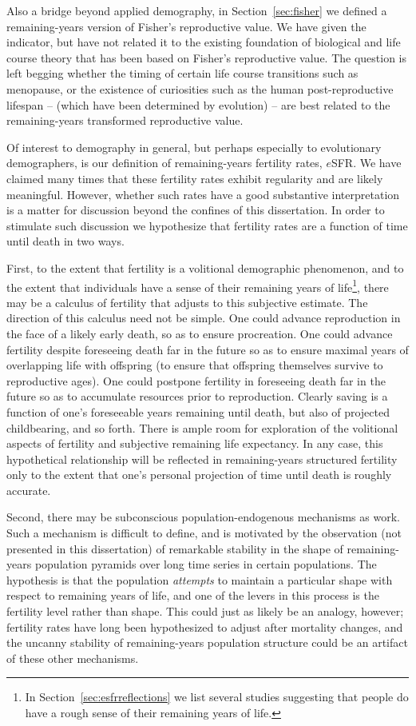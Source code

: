 Also a bridge beyond applied demography, in Section~\ref{sec:fisher} we
defined a remaining-years version of Fisher's reproductive value. We
have given the indicator, but have not related it to the existing foundation of
biological and life course theory that has been based on Fisher's reproductive
value. The question is left begging whether the timing of certain
life course transitions such as menopause, or the existence of curiosities such 
as the human post-reproductive lifespan -- (which have been determined by
evolution) -- are best related to the remaining-years transformed reproductive
value.

Of interest to demography in general, but perhaps especially to evolutionary
demographers, is our definition of remaining-years fertility rates, $e$SFR. We
have claimed many times that these fertility rates exhibit
regularity and are likely meaningful. However, whether such rates have a good
substantive interpretation is a matter for discussion beyond the confines of
this dissertation. In order to stimulate such discussion we hypothesize that fertility rates are a
function of time until death in two ways. 

First, to the extent that fertility is
a volitional demographic phenomenon, and to the extent that individuals have a
sense of their remaining years of life\footnote{In
Section~\ref{sec:esfrreflections} we list several studies suggesting that people
do have a rough sense of their remaining years of life.}, there may be a calculus of fertility that adjusts to
this subjective estimate. The direction of this calculus need not be simple. One
could advance reproduction in the face of a likely early death, so as to ensure
procreation. One could advance fertility despite foreseeing death far in the
future so as to ensure maximal years of overlapping life with offspring (to
ensure that offspring themselves survive to reproductive ages). One could
postpone fertility in foreseeing death far in the future so as to accumulate resources prior to
reproduction. Clearly saving is a function of one's foreseeable years
remaining until death, but also of projected childbearing, and so forth. There
is ample room for exploration of the volitional aspects of fertility and
subjective remaining life expectancy. In any case, this hypothetical
relationship will be reflected in remaining-years structured fertility only to
the extent that one's personal projection of time until death is roughly
accurate. 

Second, there may be subconscious population-endogenous mechanisms as work.
Such a mechanism is difficult to define, and is motivated by the
observation (not presented in this dissertation) of remarkable stability in the shape of remaining-years population pyramids over long time series in certain
populations. The hypothesis is that the population \textit{attempts} to 
maintain a particular shape with respect to remaining years of life, and one of
the levers in this process is the fertility level rather than shape. This could 
just as likely be an analogy, however; fertility rates have
long been hypothesized to adjust after mortality changes, and the uncanny
stability of remaining-years population structure could be an artifact of these
other mechanisms. 

